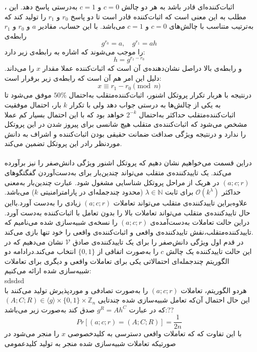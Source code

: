 ، اثبات‌کننده‌‌ای قادر باشد به هر دو چالش
$c=0$
و
$c=1$
به‌درستی پاسخ دهد. این مطلب به این معنی است که اثبات‌کننده قادر است تا دو پاسخ
$r_0$
و
$r_1$
را تولید کند که به‌ترتیب متناسب با چالش‌های
$c=0$
و
$c=1$
می‌باشد. با این حساب، مقادیر
$a$ 
و
$r_0$
و
$r_1$
رابطه‌ی
$$ g^{r_0} = a , \quad g^{r_1} = ah $$
را موجب می‌شوند که اشاره به رابطه‌ی زیر دارد:
$$ h = g^{r_1 - r_0} $$
و رابطه‌ی بالا دراصل نشان‌دهنده‌ی آن است که اثبات‌کننده عملا مقدار
$x$
را می‌داند. دلیل این امر هم آن است که رابطه‌ی زیر برقرار است:
$$ x \equiv {r_1 - r_0} \pmod n $$
درنتیجه با هربار تکرار پروتکل اشنور، اثبات‌کننده‌متقلب به‌احتمال
$ 50 \% $
موفق می‌شود تا به یکی از چالش‌ها به درستی جواب دهد ولی با تکرار 
$k$
بار، احتمال موفقیت اثبات‌کننده‌متقلب حداکثر به‌احتمال
$2^{-k}$
خواهد بود که با این احتمال بسیار کم عملا مشخص می‌شود که اثبات‌کننده‌ی متقلب هیچ شانسی برای پیروز شدن در این پروتکل را ندارد و درنتیجه ویژگی صداقت ضمانت حقیقی بودن اثبات‌کننده و اشراف به دانش موردنظر رادر این پروتکل تضمین می‌کند. 
\\
\label{zero_knowledge_property}
\\
دراین قسمت می‌خواهیم نشان دهیم که پروتکل اشنور ویژگی دانش‌صفر را نیز برآورده می‌کند.
یک تاییدکننده‌ی متقلب می‌تواند چندین‌بار برای به‌دست‌آوردن گفگتگوهای
$(a;c;r)$
در هریک از مراحل پروتکل شناسایی مشغول شود. عبارت چندین‌بار به‌معنی حداکثر
$\mathcal{O}(k^\lambda)$
برای ثابت
$\lambda \in \mathbb{N}$
(محدود چندجمله‌ای در پارامترامنیتی
$k$)
می‌باشد.
علاوه‌براین تاییدکننده‌ی متقلب می‌تواند تعاملات
$(a;c;r)$
زیادی را به‌دست آورد.بااین حال تاییدکننده‌ی متقلب می‌تواند تعاملات بالا را بدون تعامل با  اثبات‌کننده به‌دست آورد. دراین حالت تعاملات به‌دست‌آمده‌ی
$(a;c;r)$
را نسخه‌ی شبیه‌سازی شده می‌نامیم که تاییدکننده‌متقلب،نقش تاییدکننده‌ی واقعی و اثبات‌کننده‌ی واقعی را خود تنها بازی می‌کند.
\\
در قدم اول ویژگی دانش‌صفر را برای یک تاییدکننده‌ی صادق
$\mathcal{V}$
نشان می‌دهیم که در این حالت تاییدکننده یک چالش
$c$
را به‌صورت اتفاقی از
$\{0,1\}$
انتخاب می‌کند.درادامه دو الگوریتم چندجمله‌ای احتمالاتی یکی برای تعاملات واقعی و دیگری برای تعاملات شبیه‌سازی شده ارائه می‌کنیم:
\\
sdsdsd
\\
هردو الگوریتم، تعاملات
$(a;c;r)$
را به‌صورت تصادفی و موردپذیرش تولید می‌کنند با این حال احتمال آن‌که تعامل شبیه‌سازی شده چندتایی
$(A;C;R) \in \langle g \rangle \times \{0,1\} \times \mathbb{Z}_n$
که در عبارت
$g^R = Ah^C$
صدق کند به‌صورت زیر می‌باشد:??
$$Pr[(a;c;r)=(A;C;R)] = \frac{1}{2n}$$
با این تفاوت که که تعاملات واقعی دسترسی به کلیدخصوصی 
$x$
را منجر می‌شود در صورتیکه تعاملات شبیه‌سازی شده منجر به تولید کلیدعمومی
